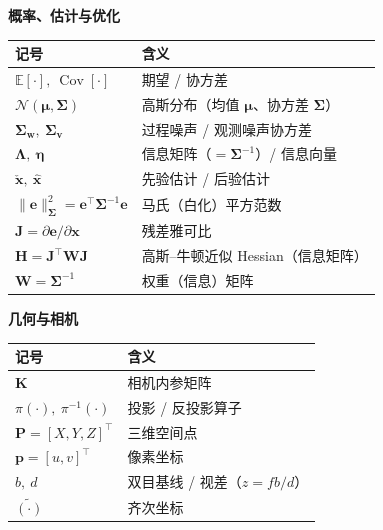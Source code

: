 \begin{center}\small
\textbf{概率、估计与优化}\par\vspace{3pt}
\begin{tabular}{ll}
\toprule
记号 & 含义 \\
\midrule
$\mathbb{E}[\cdot],\ \operatorname{Cov}[\cdot]$ & 期望 / 协方差 \\
$\mathcal{N}(\boldsymbol{\mu},\boldsymbol{\Sigma})$ & 高斯分布（均值 $\boldsymbol{\mu}$、协方差 $\boldsymbol{\Sigma}$） \\
$\boldsymbol{\Sigma}_{\mathbf{w}},\ \boldsymbol{\Sigma}_{\mathbf{v}}$ & 过程噪声 / 观测噪声协方差 \\
$\boldsymbol{\Lambda},\ \boldsymbol{\eta}$ & 信息矩阵（$=\boldsymbol{\Sigma}^{-1}$）/ 信息向量 \\
$\check{\mathbf{x}},\ \hat{\mathbf{x}}$ & 先验估计 / 后验估计 \\
$\lVert\mathbf{e}\rVert_{\boldsymbol{\Sigma}}^2=\mathbf{e}^\top\boldsymbol{\Sigma}^{-1}\mathbf{e}$ & 马氏（白化）平方范数 \\
$\mathbf{J}=\partial\mathbf{e}/\partial\mathbf{x}$ & 残差雅可比 \\
$\mathbf{H}=\mathbf{J}^\top\mathbf{W}\mathbf{J}$ & 高斯–牛顿近似 Hessian（信息矩阵） \\
$\mathbf{W}=\boldsymbol{\Sigma}^{-1}$ & 权重（信息）矩阵 \\
\bottomrule
\end{tabular}
\end{center}

\begin{center}\small
\textbf{几何与相机}\par\vspace{3pt}
\begin{tabular}{ll}
\toprule
记号 & 含义 \\
\midrule
$\mathbf{K}$ & 相机内参矩阵 \\
$\pi(\cdot),\ \pi^{-1}(\cdot)$ & 投影 / 反投影算子 \\
$\mathbf{P}=[X,Y,Z]^\top$ & 三维空间点 \\
$\mathbf{p}=[u,v]^\top$ & 像素坐标 \\
$b,\ d$ & 双目基线 / 视差（$z=fb/d$） \\
$\tilde{(\cdot)}$ & 齐次坐标 \\
\bottomrule
\end{tabular}
\end{center}
